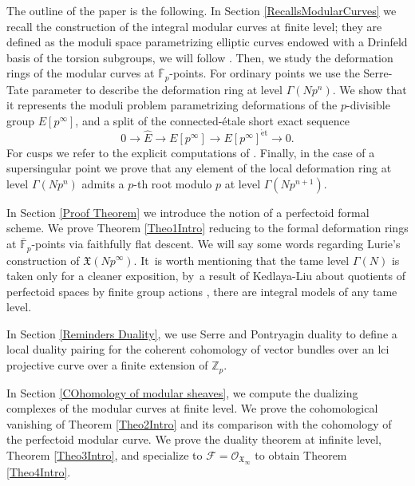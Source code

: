 \documentclass[11pt]{article}
\newcommand{\et}{\mathrm{\acute{e}t}}
\numberwithin{equation}{section}
\theoremstyle{definition}
\newcommand{\bb}[1]{\mathbb{#1}}
\newcommand{\n}[1]{\mathcal{#1}}
\newcommand{\f}[1]{\mathfrak{#1}}
\newcommand{\s}[1]{\mathscr{#1}}
\begin{document}
The outline of the paper is the following. In Section \ref{RecallsModularCurves} we recall the construction of the integral modular curves at finite level; they are defined as the moduli space parametrizing elliptic curves endowed with a Drinfeld basis of the torsion subgroups, we will follow \cite{katz1985arithmetic}. Then, we study the deformation rings of the modular curves at $\overline{\bb{F}}_p$-points. For ordinary points we use the Serre-Tate parameter to describe the deformation ring at level $\Gamma(Np^n)$. We show that it represents the moduli problem parametrizing deformations of the $p$-divisible group $E[p^\infty]$, and a split of the connected-étale short exact sequence
\[
0\to \widehat{E} \to E[p^\infty] \to E[p^\infty]^{\et}\to 0.
\]
For cusps we refer to the explicit computations of \cite[\S\S 8 \& 10]{katz1985arithmetic}. Finally, in the case of a supersingular point we prove that any element of the local deformation ring at level $\Gamma(Np^n)$ admits a $p$-th root modulo $p$ at level $\Gamma(Np^{n+1})$.

In Section \ref{Proof Theorem} we introduce the notion of a perfectoid formal scheme. We prove Theorem \ref{Theo1Intro} reducing to the formal deformation rings at $\overline{\bb{F}}_p$-points via faithfully flat descent. We will say some words regarding Lurie's construction of $\f{X}(Np^\infty)$. It~is worth mentioning that the tame level $\Gamma(N)$ is taken only for a cleaner exposition, by~a result of Kedlaya-Liu about quotients of perfectoid spaces by finite group actions \cite[Th.\,3.3.26]{kedlaya2016relative}, there are integral models of any tame level.

In Section \ref{Reminders Duality}, we use Serre and Pontryagin duality to define a local duality pairing for the coherent cohomology of vector bundles over an lci projective curve over a finite extension of $\bb{Z}_p$.

In Section \ref{COhomology of modular sheaves}, we compute the dualizing complexes of the modular curves at finite level. We prove the cohomological vanishing of Theorem \ref{Theo2Intro} and its comparison with the cohomology of the perfectoid modular curve. We prove the duality theorem at infinite level, Theorem \ref{Theo3Intro}, and specialize to $\n{F}=\s{O}_{\f{X}_{\infty}}$ to obtain Theorem \ref{Theo4Intro}.
\end{document}
